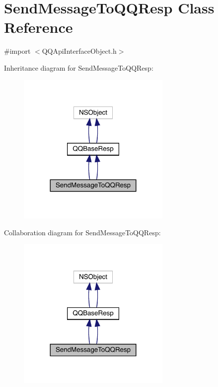\hypertarget{interface_send_message_to_q_q_resp}{}\section{Send\+Message\+To\+Q\+Q\+Resp Class Reference}
\label{interface_send_message_to_q_q_resp}


{\ttfamily \#import $<$Q\+Q\+Api\+Interface\+Object.\+h$>$}



Inheritance diagram for Send\+Message\+To\+Q\+Q\+Resp\+:\nopagebreak
\begin{figure}[H]
\begin{center}
\leavevmode
\includegraphics[width=209pt]{interface_send_message_to_q_q_resp__inherit__graph}
\end{center}
\end{figure}


Collaboration diagram for Send\+Message\+To\+Q\+Q\+Resp\+:\nopagebreak
\begin{figure}[H]
\begin{center}
\leavevmode
\includegraphics[width=209pt]{interface_send_message_to_q_q_resp__coll__graph}
\end{center}
\end{figure}
